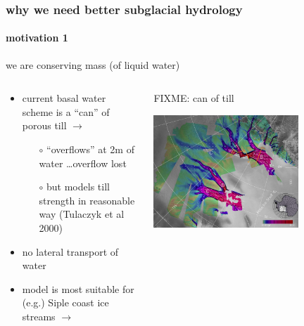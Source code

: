 \documentclass[hide notes,intlimits]{beamer}
\begin{document}
\newcommand{\whytitle}{why we need better subglacial hydrology}

\begin{frame}
  \frametitle{\whytitle}
  \framesubtitle{motivation 1}

\begin{center}
  we are  conserving mass (of liquid water)
\end{center}

\begin{columns}
\begin{column}{0.5\textwidth}
  \begin{itemize}
    \item current basal water scheme is a ``can'' of porous till $\longrightarrow$
      \begin{itemize}
        \item[$\circ$] ``overflows'' at 2m of water \dots overflow lost
        \item[$\circ$] but models till strength in reasonable way (Tulaczyk et al 2000)
      \end{itemize}
    \item no lateral transport of water
    \item model is most suitable for (e.g.) Siple coast ice streams $\longrightarrow$
  \end{itemize}
\end{column}
\begin{column}{0.5\textwidth}
FIXME: can of till

\vspace{15mm}

\includegraphics[width=0.7\textwidth]{figs/siple}
\end{column}
\end{columns}
\end{frame}
\end{document}
